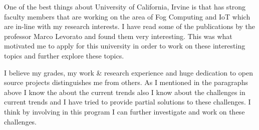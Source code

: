 \documentclass[11pt,a4paper,sans]{moderncv}        %
\begin{document}
One of the best things about University of California, Irvine is that has
strong faculty members that are working on the area of Fog Computing and IoT
which are in-line with my research interests. I have read some of the publications
by the professor Marco Levorato and found them very interesting. This was
what motivated me to apply for this university in order to work on these
interesting topics and further explore these topics.

I believe my grades, my work \& research experience and huge dedication
to open source projects distinguishes me from others. As I mentioned in the
paragraphs above I know the about the current trends also I know about the
challenges in current trends and I have tried to provide partial solutions
to these challenges. I think by involving in this program I can further
investigate and work on these challenges.

\makeletterclosing
\end{document}
